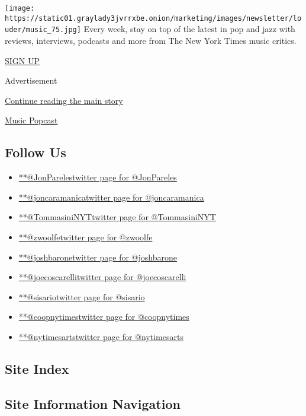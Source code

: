 \texttt{[image: https://static01.graylady3jvrrxbe.onion/marketing/images/newsletter/louder/music\_75.jpg]}
Every week, stay on top of the latest in pop and jazz with reviews,
interviews, podcasts and more from The New York Times music critics.

\href{/newsletters/signup/MS}{SIGN UP}

Advertisement

\protect\hyperlink{after-mktg}{Continue reading the main story}

\href{http://www.nytimes3xbfgragh.onion/column/popcast-pop-music-podcast}{Music
Popcast}

\hypertarget{follow-us}{%
\subsection{Follow Us}\label{follow-us}}

\begin{itemize}
\tightlist
\item
  \href{https://twitter.com/JonPareles}{**@JonParelestwitter page for
  @JonPareles}
\item
  \href{https://twitter.com/joncaramanica}{**@joncaramanicatwitter page
  for @joncaramanica}
\item
  \href{https://twitter.com/TommasiniNYT}{**@TommasiniNYTtwitter page
  for @TommasiniNYT}
\item
  \href{https://twitter.com/zwoolfe}{**@zwoolfetwitter page for
  @zwoolfe}
\item
  \href{https://twitter.com/joshbarone}{**@joshbaronetwitter page for
  @joshbarone}
\item
  \href{https://twitter.com/joecoscarelli}{**@joecoscarellitwitter page
  for @joecoscarelli}
\item
  \href{https://twitter.com/sisario}{**@sisariotwitter page for
  @sisario}
\item
  \href{https://twitter.com/coopnytimes}{**@coopnytimestwitter page for
  @coopnytimes}
\item
  \href{https://twitter.com/nytimesarts}{**@nytimesartstwitter page for
  @nytimesarts}
\end{itemize}

\hypertarget{site-index}{%
\subsection{Site Index}\label{site-index}}

\hypertarget{site-information-navigation}{%
\subsection{Site Information
Navigation}\label{site-information-navigation}}

